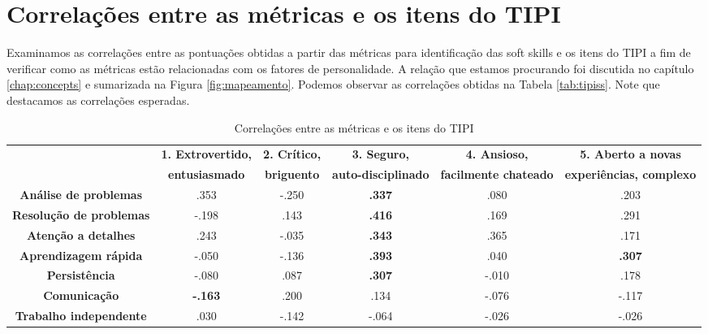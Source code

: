 \section{Correlações entre as métricas e os itens do TIPI}
\label{sec:tipiss}

Examinamos as correlações entre as pontuações obtidas a partir das métricas para identificação das soft skills e os itens do TIPI a fim de verificar como as métricas estão relacionadas com os fatores de personalidade. A relação que estamos procurando foi discutida no capítulo \ref{chap:concepts} e sumarizada na Figura \ref{fig:mapeamento}.
Podemos observar as correlações obtidas na Tabela \ref{tab:tipiss}. Note que destacamos as correlações esperadas. 

\begin{sidewaystable}[ph!]
\footnotesize
\caption{\small Correlações entre as métricas e os itens do TIPI}
\renewcommand{\arraystretch}{1.4} 
\centering
\begin{tabular}{lccccc}

    \toprule		
		& \textbf{1. Extrovertido, }  & \textbf{2. Crítico, } & \textbf{3. Seguro, } 			 & \textbf{4. Ansioso, } 				& \textbf{5. Aberto a novas } \\
		& \textbf{entusiasmado} 			& \textbf{briguento} 		& \textbf{auto-disciplinado} & \textbf{facilmente chateado} & \textbf{experiências, complexo} \\
					
    \midrule
    \multicolumn{1}{c}{\textbf{Análise de problemas}} 		& .353  				 & -.250 & \textbf{.337} & .080  & .203 				 \\
    \multicolumn{1}{c}{\textbf{Resolução de problemas}}		& -.198  				 & .143  & \textbf{.416} & .169  & .291 				 \\
    \multicolumn{1}{c}{\textbf{Atenção a detalhes}} 			& .243  				 & -.035 & \textbf{.343} & .365  & .171 				 \\
    \multicolumn{1}{c}{\textbf{Aprendizagem rápida}} 			& -.050  				 & -.136 & \textbf{.393} & .040  & \textbf{.307} \\
    \multicolumn{1}{c}{\textbf{Persistência}} 						& -.080  				 & .087  & \textbf{.307} & -.010 & .178 				 \\
    \multicolumn{1}{c}{\textbf{Comunicação}} 							& \textbf{-.163} & .200  & .134  			   & -.076 & -.117 				 \\
    \multicolumn{1}{c}{\textbf{Trabalho independente}} 		& .030  				 & -.142 & -.064 				 & -.026 & -.026 				 \\ 
		

\end{tabular}
\end{sidewaystable}
